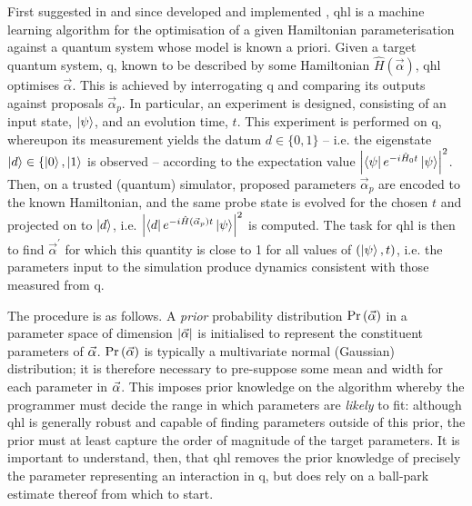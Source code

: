 \glsresetall
First suggested in \cite{Granade:2012kj} and since developed \cite{wiebe2014qhlpra, Wiebe:2014qhl} 
    and implemented \cite{gentile2020learning, wang2017experimental}, 
\gls{qhl} is a machine learning algorithm for the optimisation of a given Hamiltonian parameterisation 
    against a quantum system whose model is known a priori. 
Given a target quantum system, \gls{q}, known to be described by some Hamiltonian $\hat{H}(\vec{\alpha})$, 
    \gls{qhl} optimises $\vec{\alpha}$.
This is achieved by interrogating \gls{q} and comparing its outputs against proposals $\vec{\alpha}_p$. 
In particular, an experiment is designed, consisting of an input state, $\ket{\psi}$, and an evolution time, $t$.
This experiment is performed on \gls{q}, whereupon its measurement yields the datum $d \in \{0, 1\}$ -- 
    i.e. the eigenstate $\ket{d} \in \{ \ket{0}, \ket{1}$ is observed -- 
    according to the expectation value $\left| \bra{\psi} e^{-i \hat{H}_0 t} \ket{\psi} \right|^2$. 
Then, on a trusted (quantum) simulator, proposed parameters $\vec{\alpha}_p$ are encoded to the 
    known Hamiltonian, and the same \gls{probe} state is evolved for the chosen $t$ and projected on to $\ket{d}$, 
    i.e. $\left| \bra{d} e^{-i \hat{H}(\vec{\alpha}_p) t } \ket{\psi} \right|^2 $ is computed.
The task for \gls{qhl} is then to find $\vec{\alpha}^{\prime}$ for which this quantity 
    is close to 1 for all values of $(\ket{\psi}, t)$, 
    i.e. the parameters input to the simulation produce dynamics consistent with those measured from \gls{q}.
\par 

The procedure is as follows. 
A \emph{prior} probability distribution $\Pr\left(\vec{\alpha}\right)$ in a parameter space of dimension $\left| \vec{\alpha} \right|$ 
    is initialised to represent the constituent parameters of $\vec{\alpha}$. 
$\Pr\left(\vec{\alpha}\right)$ is typically a multivariate normal (Gaussian) distribution; 
    it is therefore necessary to pre-suppose some mean and width for each parameter in $\vec{\alpha}$. 
This imposes prior knowledge on the algorithm whereby the programmer must decide the range in 
    which parameters are \emph{likely} to fit:
    although \gls{qhl} is generally robust and capable of finding parameters outside of this prior,
    the prior must at least capture the order of magnitude of the target parameters. 
It is important to understand, then, that \gls{qhl} removes the prior knowledge 
    of precisely the parameter representing an interaction in \gls{q}, but does rely on a ball-park estimate thereof from which to start. 
\par 

